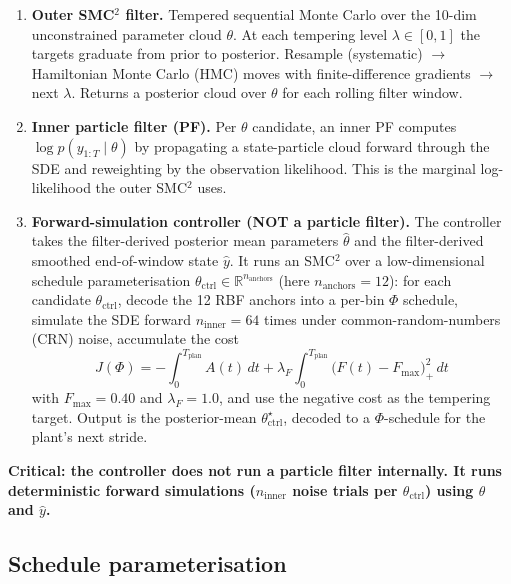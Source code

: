 \documentclass[11pt,a4paper]{article}
\begin{document}
\begin{enumerate}[itemsep=2pt]
  \item \textbf{Outer SMC$^2$ filter.} Tempered sequential Monte Carlo
        over the 10-dim unconstrained parameter cloud $\theta$. At
        each tempering level $\lambda \in [0, 1]$ the targets graduate
        from prior to posterior. Resample (systematic) $\to$
        Hamiltonian Monte Carlo (HMC) moves with finite-difference
        gradients $\to$ next $\lambda$. Returns a posterior cloud over
        $\theta$ for each rolling filter window.
  \item \textbf{Inner particle filter (PF).} Per $\theta$ candidate,
        an inner PF computes $\log p(y_{1:T} \mid \theta)$ by
        propagating a state-particle cloud forward through the SDE
        and reweighting by the observation likelihood. This is the
        marginal log-likelihood the outer SMC$^2$ uses.
  \item \textbf{Forward-simulation controller (NOT a particle filter).}
        The controller takes the filter-derived posterior mean
        parameters $\hat\theta$ and the filter-derived smoothed
        end-of-window state $\hat y$. It runs an SMC$^2$ over a
        low-dimensional schedule parameterisation $\theta_{\mathrm{ctrl}}
        \in \mathbb{R}^{n_{\mathrm{anchors}}}$ (here
        $n_{\mathrm{anchors}} = 12$): for each candidate
        $\theta_{\mathrm{ctrl}}$, decode the 12 RBF anchors into a
        per-bin $\Phi$ schedule, simulate the SDE forward
        $n_{\mathrm{inner}} = 64$ times under common-random-numbers
        (CRN) noise, accumulate the cost
        \begin{equation}
          J(\Phi) = -\!\int_0^{T_{\mathrm{plan}}} A(t) \, dt
                    + \lambda_F \!\int_0^{T_{\mathrm{plan}}}
                      \big(F(t) - F_{\max}\big)_+^2 \, dt
          \label{eq:cost}
        \end{equation}
        with $F_{\max} = 0.40$ and $\lambda_F = 1.0$, and use the
        negative cost as the tempering target. Output is the
        posterior-mean $\theta_{\mathrm{ctrl}}^\star$, decoded to a
        $\Phi$-schedule for the plant's next stride.
\end{enumerate}

\textbf{Critical: the controller does not run a particle filter
internally. It runs deterministic forward simulations
($n_{\mathrm{inner}}$ noise trials per $\theta_{\mathrm{ctrl}}$)
using $\hat\theta$ and $\hat y$.}

\subsection{Schedule parameterisation}
\end{document}
